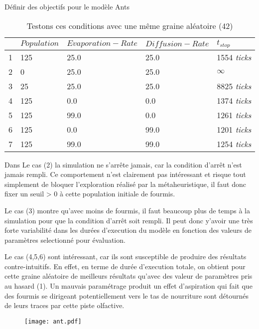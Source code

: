 \begin{testiv}{Définir des objectifs pour le modèle Ants}{}
\begin{table}[H]
\centering
\caption{Testons ces conditions avec une même graine aléatoire (42)}
\label{tab:experience}
\begin{tabular}{lllll}
\hline
  & $Population$ & $Evaporation-Rate$ & $Diffusion-Rate$ & $t_{stop}$ \\ \hline
1 & 125        & 25.0             & 25.0  & 1554 \textit{ticks} \\
2 & 0          & 25.0             & 25.0  & $\infty$ \\
3 & 25         & 25.0             & 25.0  & 8825 \textit{ticks} \\
4 & 125        & 0.0              & 0.0   & 1374 \textit{ticks} \\
5 & 125        & 99.0             & 0.0   & 1261 \textit{ticks} \\
6 & 125        & 0.0              & 99.0  & 1201 \textit{ticks} \\
7 & 125        & 99.0             & 99.0  & 1254 \textit{ticks} \\ \hline
\end{tabular}
\end{table}

Dans Le cas (2) la simulation ne s'arrête jamais, car la condition d'arrêt n'est jamais rempli. Ce comportement n'est clairement pas intéressant et risque tout simplement de bloquer l'exploration réalisé par la métaheuristique, il faut donc fixer un seuil > 0 à cette population initiale de fourmis.

Le cas (3) montre qu'avec moins de fourmis, il faut beaucoup plus de temps à la simulation pour que la condition d'arrêt soit rempli. Il peut donc y'avoir une très forte variabilité dans les durées d'execution du modèle en fonction des valeurs de paramètres selectionné pour évaluation.

Le cas (4,5,6) sont intéressant, car ils sont susceptible de produire des résultats contre-intuitifs. En effet, en terme de durée d'execution totale, on obtient pour cette graine aléatoire de meilleurs résultats qu'avec des valeur de paramètres pris au hasard (1). Un mauvais paramétrage produit un effet d'aspiration qui fait que des fourmis se dirigeant potentiellement vers le tas de nourriture sont détournés de leurs traces par cette piste olfactive.

\begin{figure}[H]
	 \centering
	 	\texttt{[image: ant.pdf]}
\end{figure}


\end{testiv}

